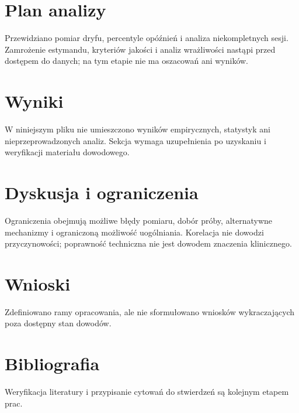 \documentclass[11pt,a4paper]{article}
\begin{document}
\section{Plan analizy}

Przewidziano pomiar dryfu, percentyle opóźnień i analiza niekompletnych sesji. Zamrożenie estymandu, kryteriów jakości i analiz wrażliwości nastąpi przed dostępem do danych; na tym etapie nie ma oszacowań ani wyników.

\section{Wyniki}

W niniejszym pliku nie umieszczono wyników empirycznych, statystyk ani nieprzeprowadzonych analiz. Sekcja wymaga uzupełnienia po uzyskaniu i weryfikacji materiału dowodowego.

\section{Dyskusja i ograniczenia}

Ograniczenia obejmują możliwe błędy pomiaru, dobór próby, alternatywne mechanizmy i ograniczoną możliwość uogólniania. Korelacja nie dowodzi przyczynowości; poprawność techniczna nie jest dowodem znaczenia klinicznego.

\section{Wnioski}

Zdefiniowano ramy opracowania, ale nie sformułowano wniosków wykraczających poza dostępny stan dowodów.

\section*{Bibliografia}

Weryfikacja literatury i przypisanie cytowań do stwierdzeń są kolejnym etapem prac.
\end{document}
